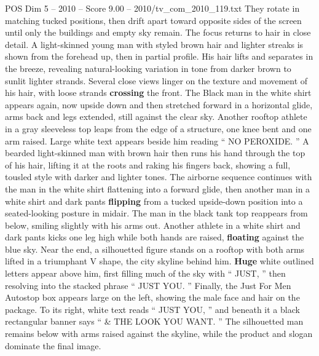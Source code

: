 \begin{textsample}{POS Dim 5 – 2010 – Score 9.00 – 2010/tv\_com\_2010\_119.txt}
They rotate in matching tucked positions, then drift apart toward opposite sides of the screen until only the buildings and empty sky remain.
The focus returns to hair in close detail.
A light-skinned young man with styled brown hair and lighter streaks is shown from the forehead up, then in partial profile.
His hair lifts and separates in the breeze, revealing natural-looking variation in tone from darker brown to sunlit lighter strands.
Several close views linger on the texture and movement of his hair, with loose strands \textbf{crossing} the front.
The Black man in the white shirt appears again, now upside down and then stretched forward in a horizontal glide, arms back and legs extended, still against the clear sky.
Another rooftop athlete in a gray sleeveless top leaps from the edge of a structure, one knee bent and one arm raised.
Large white text appears beside him reading “ NO PEROXIDE. ” A bearded light-skinned man with brown hair then runs his hand through the top of his hair, lifting it at the roots and raking his fingers back, showing a full, tousled style with darker and lighter tones.
The airborne sequence continues with the man in the white shirt flattening into a forward glide, then another man in a white shirt and dark pants \textbf{flipping} from a tucked upside-down position into a seated-looking posture in midair.
The man in the black tank top reappears from below, smiling slightly with his arms out.
Another athlete in a white shirt and dark pants kicks one leg high while both hands are raised, \textbf{floating} against the blue sky.
Near the end, a silhouetted figure stands on a rooftop with both arms lifted in a triumphant V shape, the city skyline behind him. \textbf{Huge} white outlined letters appear above him, first filling much of the sky with “ JUST, ” then resolving into the stacked phrase “ JUST YOU. ” Finally, the Just For Men Autostop box appears large on the left, showing the male face and hair on the package.
To its right, white text reads “ JUST YOU, ” and beneath it a black rectangular banner says “ \& THE LOOK YOU WANT. ” The silhouetted man remains below with arms raised against the skyline, while the product and slogan dominate the final image.

\end{textsample}

